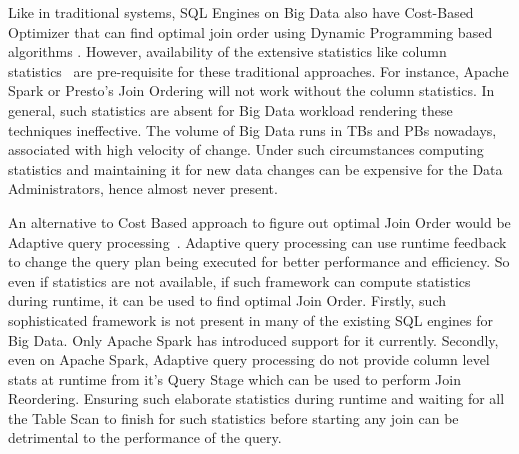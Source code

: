 \documentclass[conference]{IEEEtran}
\begin{document}
Like in traditional systems, SQL Engines on Big Data also have Cost-Based Optimizer that can find  optimal join order using Dynamic Programming based algorithms \cite{b1}. However, availability of the extensive statistics like column statistics~\cite{b11} are pre-requisite for these traditional approaches. For instance, Apache Spark or Presto's Join Ordering will not work without the column statistics. In general, such statistics are absent for Big Data workload rendering these techniques ineffective. The volume of Big Data runs in TBs and PBs nowadays, associated with high velocity of change. Under such circumstances  computing statistics and maintaining it for new data changes can be expensive for the Data Administrators, hence almost never present.

An alternative to Cost Based approach to figure out optimal Join Order would be Adaptive query processing~\cite{b12}. Adaptive query processing can use runtime feedback to change the query plan being executed for better performance and efficiency. So even if statistics are not available, if such framework can compute statistics during runtime, it can be used to find optimal Join Order.
Firstly, such sophisticated framework is not present in many of the existing SQL engines for Big Data. Only Apache Spark has introduced support for it currently.  Secondly, 
even on Apache Spark, Adaptive query processing  do not provide column level stats at runtime from it's Query Stage which can be used to perform Join Reordering. Ensuring such elaborate statistics during runtime and waiting for all the Table Scan to finish for such statistics before starting any join can be detrimental to the performance of the query.
\end{document}
